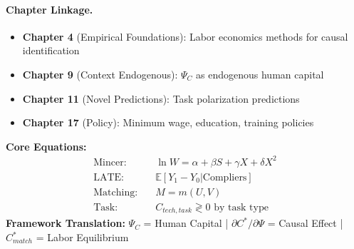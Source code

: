 \paragraph{Chapter Linkage.}
\begin{itemize}[noitemsep]
    \item \textbf{Chapter 4} (Empirical Foundations): Labor economics methods for causal identification
    \item \textbf{Chapter 9} (Context Endogenous): $\Psi_C$ as endogenous human capital
    \item \textbf{Chapter 11} (Novel Predictions): Task polarization predictions
    \item \textbf{Chapter 17} (Policy): Minimum wage, education, training policies
\end{itemize}

\begin{abstract}
This appendix integrates labor economics into the $(C, \Psi, C^*, K, Q)$ framework, demonstrating how human capital theory provides $\Psi_C$ as investment, the credibility revolution enables causal identification of $\partial C^*/\partial \Psi$, and task-based analysis explains technology-work complementarities. Covering 20 foundational papers (6 Nobel Prizes: Arrow, Becker, Heckman, DMP, Card-Angrist-Imbens, Goldin), this appendix establishes labor markets as the domain where human configurations $C$ meet institutional context $\Psi$ most directly. Key contributions: (1) human capital as deliberate $\Psi_C$ investment, (2) natural experiments and IV for causal effects, (3) task framework for technology-complementarity analysis, (4) matching theory for labor market $C^*$, and (5) gender/inequality dynamics.
\end{abstract}

\begin{tcolorbox}[colback=yellow!5!white, colframe=orange!75!black, title=\textbf{Quick Reference: Labor Economics Equations}]
\small
\textbf{Core Equations:}
\begin{align}
\text{Mincer:} \quad & \ln W = \alpha + \beta S + \gamma X + \delta X^2 \tag{MUL1-1} \\
\text{LATE:} \quad & \mathbb{E}[Y_1 - Y_0 | \text{Compliers}] \tag{MUL1-2} \\
\text{Matching:} \quad & M = m(U, V) \tag{MUL1-3} \\
\text{Task:} \quad & C_{tech, task} \gtrless 0 \text{ by task type} \tag{MUL1-4}
\end{align}
\textbf{Framework Translation:}
$\Psi_C$ = Human Capital | $\partial C^*/\partial \Psi$ = Causal Effect | $C^*_{match}$ = Labor Equilibrium
\end{tcolorbox}

